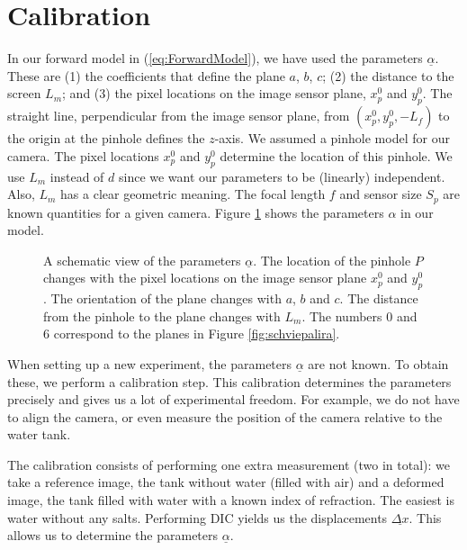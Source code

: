 \documentclass{svjour3}                     %
\begin{document}
\section{Calibration}
\label{sec:cal}
In our forward model in (\ref{eq:ForwardModel}), we have used the parameters $\underline{\alpha}$. These are (1) the coefficients that define the plane $a$, $b$, $c$; (2) the distance to the screen $L_m$; and (3)  the pixel locations on the image sensor plane, $x_p^0$ and $y_p^0$. The straight line, perpendicular from the image sensor plane, from $(x_p^0, y_p^0, -L_f)$ to the origin at the pinhole defines the $z$-axis. We assumed a pinhole model for our camera. The pixel locations $x_p^0$ and $y_p^0$ determine the location of this pinhole.  We use $L_m$ instead of $d$ since we want our parameters to be (linearly) independent. Also, $L_m$ has a clear geometric meaning. The focal length $f$ and sensor size $S_p$ are known quantities for a given camera. Figure \ref{fig:calpar} shows the parameters $\alpha$ in our model.

\begin{figure}[hpbt]
	
	\caption{A schematic view of the parameters $\underline{\alpha}$. The location of the pinhole $P$ changes with the pixel locations on the image sensor plane $x_p^0$ and $y_p^0$. The orientation of the plane changes with $a$, $b$ and $c$. The distance from the pinhole to the plane changes with $L_m$. The numbers $0$ and $6$ correspond to the planes in Figure \ref{fig:schviepalira}.}	
\label{fig:calpar}	
\end{figure}

When setting up a new experiment, the parameters $\underline{\alpha}$ are not known. To obtain these, we perform a calibration step. This calibration determines the parameters precisely and gives us a lot of experimental freedom. For example, we do not have to align the camera, or even measure the position of the camera relative to the water tank.

The calibration consists of performing one extra measurement (two in total): we take a reference image, the tank without water (filled with air) and a deformed image, the tank filled with water with a known index of refraction. The easiest is water without any salts. Performing DIC yields us the displacements $\underline{\Delta x}$. This allows us to determine the parameters $\underline{\alpha}.$
\end{document}
